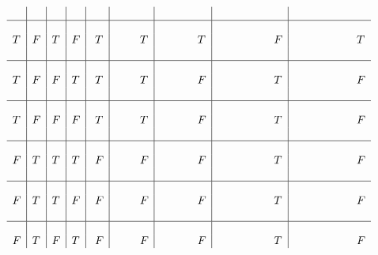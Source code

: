 \documentclass[10pt]{article}
\begin{document}
\[\begin{array}{l|l|l|l|l|l|l|l|l}
  & & & & & & & & \\
  \hline & & & & & & & & \\
  T & F & T & F & \ T & \hspace{8mm} T & \hspace{12mm}T & \hspace{18mm}F & \hspace{20mm} T\\ 
  & & & & & & & & \\
  \hline & & & & & & & & \\
  T & F & F & T & \ T & \hspace{8mm} T & \hspace{12mm}F & \hspace{18mm}T & \hspace{20mm} F\\ 
  & & & & & & & & \\
  \hline & & & & & & & & \\
  T & F & F & F & \ T & \hspace{8mm} T & \hspace{12mm}F & \hspace{18mm}T & \hspace{20mm} F \\ 
  & & & & & & & & \\
  \hline & & & & & & & & \\
  F & T & T & T & \ F & \hspace{8mm} F & \hspace{12mm}F & \hspace{18mm}T & \hspace{20mm} F\\ 
  & & & & & & & & \\
  \hline & & & & & & & & \\
  F & T & T & F & \ F & \hspace{8mm} F & \hspace{12mm}F & \hspace{18mm}T & \hspace{20mm} F\\ 
  & & & & & & & & \\
  \hline & & & & & & & & \\
  F & T & F & T & \ F & \hspace{8mm} F & \hspace{12mm}F & \hspace{18mm}T & \hspace{20mm} F\\ 

\end{array}\]
\end{document}
